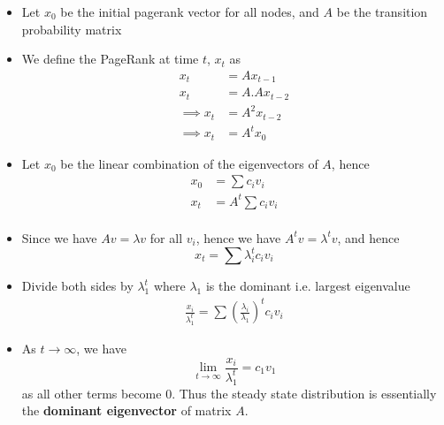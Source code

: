 \documentclass{article}
\begin{document}
\begin{itemize}
    \item Let $x_0$ be the initial pagerank vector for all nodes, and $A$ be the transition probability matrix
    
    \item We define the PageRank at time $t$, $x_t$ as
    \begin{align*}
        x_t &= A x_{t-1} \\
        x_t &= A. A x_{t-2} \\
        \implies x_t &= A^2 x_{t-2} \\
        \implies x_t &= A^t x_0
    \end{align*}
    
    \item Let $x_0$ be the linear combination of the eigenvectors of $A$, hence
    \begin{align*}
        x_0 &= \sum c_i v_i \\
        x_t &= A^t \sum c_i v_i \\
    \end{align*}
    
    \item Since we have $Av = \lambda v$ for all $v_i$, hence we have $A^t v = \lambda^t v$, and hence 
    \begin{equation*}
        x_t = \sum \lambda_i^t c_i v_i
    \end{equation*}
    
    \item Divide both sides by $\lambda_1^t$ where $\lambda_1$ is the dominant i.e. largest eigenvalue
    \begin{align*}
        \frac{x_i}{\lambda_1^t} = \sum \left( \frac{\lambda_i}{\lambda_1} \right)^t c_i v_i
    \end{align*}
    
    \item As $t \rightarrow \infty$, we have 
    \begin{equation*}
        \lim_{t \to \infty} \frac{x_i}{\lambda_1^t} = c_1 v_1
    \end{equation*}
    as all other terms become 0. Thus the steady state distribution is essentially the \textbf{dominant eigenvector} of matrix $A$.
\end{itemize}
\end{document}
